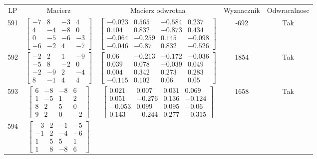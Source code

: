 \documentclass[a4paper,12pt]{article}
\begin{document}
\bgroup {} \vspace{0.2in} \begin{tabular}{c c c c c}
LP & Macierz & Macierz odwrotna & Wyznacznik & Odwracalnosc\\
591
&
$\begin{bmatrix} -7 & 8 & -3 & 4 \\ 4 & -4 & -8 & 0 \\ 0 & -5 & -6 & -3 \\ -6 & -2 & 4 & -7 \end{bmatrix}$
&
$\begin{bmatrix} -0.023 & 0.565 & -0.584 & 0.237 \\ 0.104 & 0.832 & -0.873 & 0.434 \\ -0.064 & -0.259 & 0.145 & -0.098 \\ -0.046 & -0.87 & 0.832 & -0.526 \end{bmatrix}$
&
-692
&
Tak
\\
592
&
$\begin{bmatrix} -2 & 2 & 1 & -9 \\ -5 & 8 & -2 & 0 \\ -2 & -9 & 2 & -4 \\ 8 & -1 & 4 & 4 \end{bmatrix}$
&
$\begin{bmatrix} 0.06 & -0.213 & -0.172 & -0.036 \\ 0.039 & 0.078 & -0.039 & 0.049 \\ 0.004 & 0.342 & 0.273 & 0.283 \\ -0.115 & 0.102 & 0.06 & 0.05 \end{bmatrix}$
&
1854
&
Tak
\\
593
&
$\begin{bmatrix} 6 & -8 & -8 & 6 \\ 1 & -5 & 1 & 2 \\ 8 & 2 & 5 & 0 \\ 9 & 2 & 0 & -2 \end{bmatrix}$
&
$\begin{bmatrix} 0.021 & 0.007 & 0.031 & 0.069 \\ 0.051 & -0.276 & 0.136 & -0.124 \\ -0.053 & 0.099 & 0.095 & -0.06 \\ 0.143 & -0.244 & 0.277 & -0.315 \end{bmatrix}$
&
1658
&
Tak
\\
594
&
$\begin{bmatrix} -3 & 2 & -1 & -5 \\ -1 & 2 & -4 & -6 \\ 1 & 5 & 5 & 1 \\ 1 & 8 & -8 & 6 \end{bmatrix}$

\end{tabular}
\end{document}
